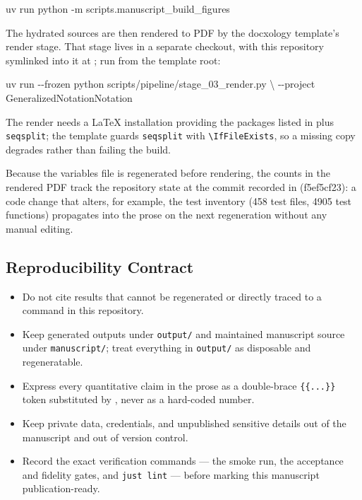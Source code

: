 \documentclass[
  english,
  9pt,
]{extarticle}
\newenvironment{Shaded}{}{}
\newcommand{\AttributeTok}[1]{\textcolor[rgb]{0.49,0.56,0.16}{#1}}
\newcommand{\DataTypeTok}[1]{\textcolor[rgb]{0.56,0.13,0.00}{#1}}
\newcommand{\ExtensionTok}[1]{#1}
\newcommand{\NormalTok}[1]{#1}
\providecommand{\tightlist}{%
  \setlength{\itemsep}{0pt}\setlength{\parskip}{0pt}}
\begin{document}
\begin{Shaded}
\begin{Highlighting}[]
\ExtensionTok{uv}\NormalTok{ run python }\AttributeTok{{-}m}\NormalTok{ scripts.manuscript\_build\_figures}
\end{Highlighting}
\end{Shaded}

The hydrated sources are then rendered to PDF by the docxology
template's render stage. That stage lives in a separate checkout, with
this repository symlinked into it at
; run from the
template root:

\begin{Shaded}
\begin{Highlighting}[]
\ExtensionTok{uv}\NormalTok{ run }\AttributeTok{{-}{-}frozen}\NormalTok{ python scripts/pipeline/stage\_03\_render.py }\DataTypeTok{\textbackslash{}}
  \AttributeTok{{-}{-}project}\NormalTok{ GeneralizedNotationNotation}
\end{Highlighting}
\end{Shaded}

The render needs a LaTeX installation providing the packages listed in
 plus \texttt{seqsplit}; the template
guards \texttt{seqsplit} with \texttt{\textbackslash{}IfFileExists}, so
a missing copy degrades rather than failing the build.

Because the variables file is regenerated before rendering, the counts
in the rendered PDF track the repository state at the commit recorded in
 (f5ef5cf23): a code
change that alters, for example, the test inventory (458 test files,
4905 test functions) propagates into the prose on the next regeneration
without any manual editing.

\subsection{Reproducibility Contract}\label{reproducibility-contract}

\begin{itemize}
\tightlist
\item
  Do not cite results that cannot be regenerated or directly traced to a
  command in this repository.
\item
  Keep generated outputs under \texttt{output/} and maintained
  manuscript source under \texttt{manuscript/}; treat everything in
  \texttt{output/} as disposable and regeneratable.
\item
  Express every quantitative claim in the prose as a double-brace
  \texttt{\{\{...\}\}} token substituted by
  , never as a
  hard-coded number.
\item
  Keep private data, credentials, and unpublished sensitive details out
  of the manuscript and out of version control.
\item
  Record the exact verification commands --- the smoke run, the
  acceptance and fidelity gates, and \texttt{just\ lint} --- before
  marking this manuscript publication-ready.
\end{itemize}
\end{document}

